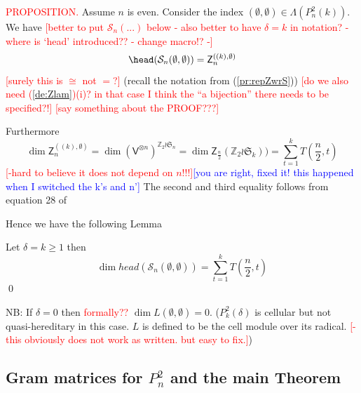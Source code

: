 \documentclass[reqno,10pt,a4paper]{amsart}
\renewcommand{\ge}{\geqslant}
\newcommand{\Z}{\mathbb{Z}}
\newcommand{\blue}[1]{\textcolor{blue}{#1}}
\newcommand{\red}[1]{\textcolor{red}{#1}}
\newcommand{\ppm}[1]{\red{#1}}
\newcommand{\ca}[1]{\blue{#1}}
\newcommand{\kn}{k}
\newcommand{\nk}{n}  %
\newcommand{\spine}{\mathcal{S}_n(\emptyset,\emptyset)}
\newcommand{\Sym}{\mathfrak{S}}
\newcommand{\cell}{\mathcal{S}}
\newcommand{\SSS}{\mathcal{S}} %
\begin{document}
{{\mdef 
\ppm{PROPOSITION.}
Assume $\nk$ is even. 
Consider the index
$(\emptyset,\emptyset)\in\Lambda(P^2_\nk(\kn))$. 
We have 
\ppm{[better to put $\SSS_n(...)$ below 
- also better to have $\delta=k$ in notation?
- where is `head' introduced??
- change macro!? -]}
$$
\head(\spine)
=  \mathsf{Z}_{\nk}^{((\kn),\emptyset)}
$$ 
\ppm{[surely this is $\cong$ not $=$?]}
(recall the notation from (\ref{pr:repZwrS}))  %
\ppm{[do we also need (\ref{de:Zlam})(i)? in that case I think the ``a bijection'' there needs to be specified?!]}
\ppm{[say something about the PROOF???]}


\mdef 
Furthermore
\[
\dim\mathsf{Z}_{\nk}^{((\kn),\emptyset)}
=\dim (\mathsf{V}^{\otimes \nk})^{\Z_2 \wr\Sym_n}
=\dim\mathsf{Z}_{\frac{\nk}{2}}(\Z_2 \wr\Sym_\kn))
=\sum_{t=1}^{\kn} T(\frac{\nk}{2}, t)
\]
\ppm{[-hard to believe it does not depend on $n$!!!]}\ca{[you are right, fixed it! this happened when I switched the k's and n']}
The second and third equality  follows from equation 28 of \cite{benkart2017walks}



Hence we have the following Lemma
\begin{lem}\label{dimL}
Let $\delta =\kn \ge 1$ then
$$\dim head(\cell_\nk(\emptyset, \emptyset)) %
= %
\sum_{t=1}^{\kn} T(\frac{\nk}{2}, t)
$$\qed
\end{lem}
NB: If $\delta =0$ then 
\ppm{formally??}
$\dim L(\emptyset, \emptyset) =0$. 
($P^2_\kn(\delta)$ is
cellular but not quasi-hereditary in this case. $L$ is defined to be
the cell module over its radical.
\ppm{[-this obviously does not work as written. but easy to fix.]})

}}


\subsection{Gram matrices for $P^2_n$  and the main Theorem} $\;$ 
\label{ss:avengers-end-game}



\end{document}

